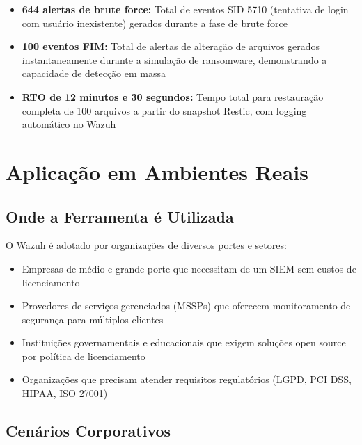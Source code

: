\documentclass[12pt,a4paper]{article}
\begin{document}
    \begin{itemize}
        \item \textbf{644 alertas de brute force:} Total de eventos SID 5710 (tentativa de login com usuário inexistente) gerados durante a fase de brute force
        \item \textbf{100 eventos FIM:} Total de alertas de alteração de arquivos gerados instantaneamente durante a simulação de ransomware, demonstrando a capacidade de detecção em massa
        \item \textbf{RTO de 12 minutos e 30 segundos:} Tempo total para restauração completa de 100 arquivos a partir do snapshot Restic, com logging automático no Wazuh
    \end{itemize}

    \newpage
    \section{Aplicação em Ambientes Reais}

    \subsection{Onde a Ferramenta é Utilizada}

    O Wazuh é adotado por organizações de diversos portes e setores:
    \begin{itemize}
        \item Empresas de médio e grande porte que necessitam de um SIEM sem custos de licenciamento
        \item Provedores de serviços gerenciados (MSSPs) que oferecem monitoramento de segurança para múltiplos clientes
        \item Instituições governamentais e educacionais que exigem soluções open source por política de licenciamento
        \item Organizações que precisam atender requisitos regulatórios (LGPD, PCI DSS, HIPAA, ISO 27001)
    \end{itemize}

    \subsection{Cenários Corporativos}
\end{document}
